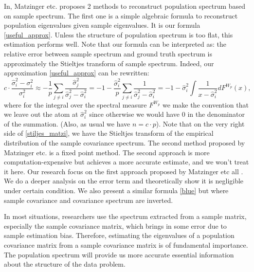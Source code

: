 \documentclass[12pt]{amsart}
\theoremstyle{definition}
\numberwithin{equation}{section}
\numberwithin{equation}{section}
\theoremstyle{remark}
\numberwithin{equation}{section}
\begin{document}
In\cite{amsalu2018recovery}, Matzinger etc. proposes 2 methods to reconstruct population spectrum based on sample spectrum. The first one is a simple algebraic formula to reconstruct population eigenvalues given sample eigenvalues. It is our formula \ref{useful_approx}. Unless the structure of population spectrum is too flat, this estimation performs well. Note that our formula can be interpreted as: the relative error between sample spectrum and ground truth spectrum is approximately the Stieltjes transform of sample spectrum. Indeed, our approximation \ref{useful_approx} can be rewritten:
 \begin{equation}
 \label{stiljes_matzi}
 c\cdot \frac{\hat{\sigma}_i^2-\sigma_i^2}{\sigma^2_i}\approx
 -\frac{1}{p}\sum_{j\neq i}
 \frac{\hat{\sigma}_{j}^2}
 {\hat{\sigma}_{j}^2-\hat{\sigma}_i^2}=-1-\frac{\hat{\sigma}^2_i}{p}\sum_{j\neq i}
 \frac{1}
 {\hat{\sigma}_{j}^2-\hat{\sigma}_i^2}=-1 -\hat{\sigma}^2_i \int  \frac{1}{x-\hat{\sigma}^2_i}dF^{W_p}(x),
 \end{equation}
 where for the integral over the spectral measure $F^{W_p}$ we make the convention that we leave out the atom at $\hat{\sigma}^2_i$ since otherwise we would have $0$ in the denominator of the summation. (Also, as usual we have $n=c\cdot p$). Note that on the very right side of \ref{stiljes_matzi}, we have the Stieltjes transform of the empirical distribution of the sample covariance spectrum. The second method proposed by Matzinger etc.\cite{amsalu2018recovery} is a fixed point method. The second approach is more computation-expensive but achieves a more accurate estimate, and we won't treat it here. Our research focus on the first approach proposed by  Matzinger etc all \cite{amsalu2018recovery}. We do a deeper analysis on the error term and theoretically show it is negligible under certain condition. We also present a similar formula \ref{blue} but where sample covariance and covariance spectrum are inverted.
 
In most situations, researchers use the spectrum extracted from a sample matrix, especially the sample covariance matrix, which brings in some error due to sample estimation bias. Therefore, estimating the eigenvalues of a population covariance matrix from a sample covariance matrix is of fundamental importance. The population spectrum will provide us more accurate essential information about the structure of the data problem\cite{burda2004signal}.
\end{document}
